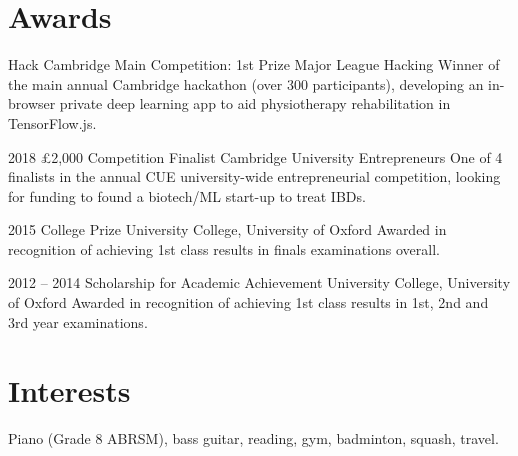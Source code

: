 \documentclass[]{friggeri-cv} %
\begin{document}
\pagebreak
\section{Awards}

\begin{entrylist}
	
    {Hack Cambridge Main Competition: 1st Prize}
    {Major League Hacking}
    {Winner of the main annual Cambridge hackathon (over 300 participants), developing an in-browser private deep learning app to aid physiotherapy rehabilitation in TensorFlow.js.}
	
    \entrysmall
    {2018}
    {£2,000 Competition Finalist}
    {Cambridge University Entrepreneurs}
    {One of 4 finalists in the annual CUE university-wide entrepreneurial competition, looking for
    funding to found a biotech/ML start-up to treat IBDs.}
    	
	\entrysmall
	{2015}
	{College Prize}
	{University College, University of Oxford}
	{Awarded in recognition of achieving 1st class results in finals examinations overall.}
    	
	\entrysmall
	{2012 -- 2014}
	{Scholarship {\normalfont for Academic Achievement}}
	{University College, University of Oxford}
	{Awarded in recognition of achieving 1st class results in 1st, 2nd and 3rd year examinations.}
	
	
\end{entrylist}


\section{Interests}

Piano (Grade 8 ABRSM), bass guitar, reading, gym, badminton, squash, travel.


\iffalse
\end{document}
